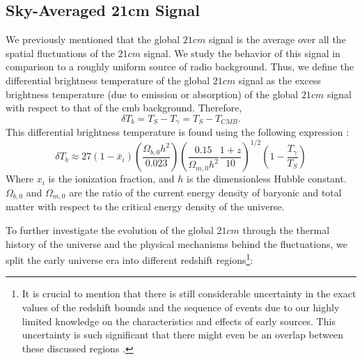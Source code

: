 \documentclass[12pt, TexShade, letterpaper]{report}
\begin{document}
\subsection{Sky-Averaged 21cm Signal}
\label{chap:global21cm,sub:physics,sub:global}
We previously mentioned that the global $21cm$ signal is the average over all the spatial fluctuations of the $21cm$ signal. We study the behavior of this signal in comparison to a roughly uniform source of radio background. Thus, we define the differential brightness temperature of the global $21cm$ signal as the excess brightness temperature (due to emission or absorption) of the global $21cm$ signal with respect to that of the \gls{cmb} background. Therefore,
\begin{equation}
    \delta T_b = T_{S} - T_{\gamma} = T_S - T_{CMB}.
\end{equation}
This differential brightness temperature is found using the following expression \cite{low_frequency}:
\begin{equation}
    \delta T_b \approx 27 \left(1- \bar{x}_i\right) \left(\frac{\Omega_{b, 0}h^2}{0.023}\right) \left( \frac{0.15}{\Omega_{m, 0}h^2} \frac{1+z}{10}\right)^{1/2}\left(1-\frac{T_\gamma}{T_S}\right)
    \label{eq:global_curve}
\end{equation}
Where $x_i$ is the ionization fraction, and $h$ is the dimensionless Hubble constant. $\Omega_{b, 0}$ and $\Omega_{m, 0}$ are the ratio of the current energy density of baryonic and total matter with respect to the critical energy density of the universe.\par
To further investigate the evolution of the global $21cm$ through the thermal history of the universe and the physical mechanisms behind the fluctuations, we split the early universe era into different redshift regions\footnote{It is crucial to mention that there is still considerable uncertainty in the exact values of the redshift bounds and the sequence of events due to our highly limited knowledge on the characteristics and effects of early sources. This uncertainty is such significant that there might even be an overlap between these discussed regions \cite{21century}.}:\par
\end{document}

